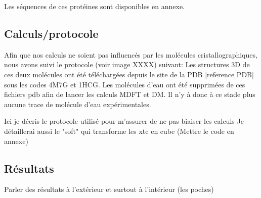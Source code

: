 Les séquences de ces protéines sont disponibles en annexe.


\subsection{Calculs/protocole}
Afin que nos calculs ne soient pas influencés par les molécules cristallographiques, nous avons suivi le protocole (voir image XXXX) suivant: Les structures 3D de ces deux molécules ont été téléchargées depuis le site de la PDB [reference PDB] sous les codes 4M7G et 1HCG.
Les molécules d'eau ont été supprimées de ces fichiers pdb afin de lancer les calculs MDFT et DM. Il n'y à donc à ce stade plus aucune trace de molécule d'eau expérimentales.







Ici je décris le protocole utilisé pour m'assurer de ne pas biaiser les calculs
Je détaillerai aussi le "soft" qui transforme les xtc en cube (Mettre le code en annexe)


\subsection{Résultats}
Parler des résultats à l'extérieur et surtout à l'intérieur (les poches)



